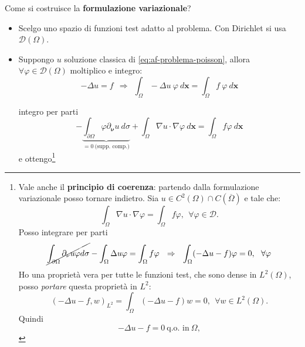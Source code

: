 \documentclass[10pt,a4paper,twoside,openright]{book}
\begin{document}
Come si costruisce la \textbf{formulazione variazionale}?
\begin{itemize}
	\item Scelgo uno spazio di funzioni test adatto al problema. Con Dirichlet si usa $\displaystyle \mathcal{D}( \Omega )$.
	\item Suppongo $\displaystyle u$ soluzione classica di \eqref{eq:af-problema-poisson}, allora $\displaystyle \forall \varphi \in \mathcal{D}( \Omega )$ moltiplico e integro:
	      \begin{equation*}
	      	-\Delta u=f\ \ \Rightarrow \ \ \int _{\Omega } -\Delta u\ \varphi \ d\mathbf{x} =\int _{\Omega } f\ \varphi \ d\mathbf{x}
	      \end{equation*}
	      
	      integro per parti
	      \begin{equation*}
	      	-\underbrace{\int _{\partial \Omega } \varphi \partial _{\bm{\nu }} u\ d\sigma }_{=0\ \text{(supp. comp.)}} +\int _{\Omega } \nabla u\cdotp \nabla \varphi \ d\mathbf{x} =\int _{\Omega } f\varphi \ d\mathbf{x}
	      \end{equation*}
	      \newpage
	      e ottengo\footnote{Vale anche il \textbf{principio di coerenza}: partendo dalla formulazione variazionale posso tornare indietro. Sia $\displaystyle u\in C^{2}( \Omega ) \cap C(\overline{\Omega })$ e tale che:
	      	\begin{equation*}
	      		\int _{\Omega } \nabla u\cdotp \nabla \varphi =\int _{\Omega } f\varphi ,\ \ \forall \varphi \in \mathcal{D} .
	      	\end{equation*}
	      	Posso integrare per parti
	      	\begin{equation*}
	      		\cancel{\int _{\partial \Omega } \partial _{\nu } u\varphi d\sigma } -\int _{\Omega } \Delta u\varphi =\int _{\Omega } f\varphi \ \ \Rightarrow \ \ \int _{\Omega }( -\Delta u-f) \varphi =0,\ \ \forall \varphi 
	      	\end{equation*}
	      	Ho una proprietà vera per tutte le funzioni test, che sono dense in $\displaystyle L^{2}( \Omega )$, posso \textit{portare} questa proprietà in $\displaystyle L^{2}$:
	      	\begin{equation*}
	      		( -\Delta u-f,w)_{L^{2}} =\int _{\Omega }( -\Delta u-f) w=0,\ \ \forall w\in L^{2}( \Omega ) .
	      	\end{equation*}
	      	Quindi 
	      	\begin{equation*}
	      		-\Delta u-f=0\ \text{q.o. in} \ \Omega ,
	      	\end{equation*}
}
\end{itemize}
\end{document}
